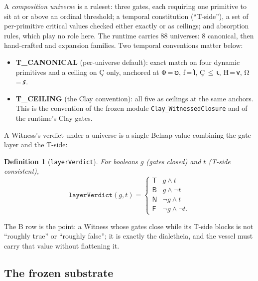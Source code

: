 \documentclass[12pt,a4paper]{article}
\newtheorem{definition}[theorem]{Definition}
\newcommand{\igp}[1]{{\igprimfont #1}}
\newcommand{\shav}[1]{{\shavfont #1}}
\newcommand{\bN}{\textsf{N}}
\newcommand{\bT}{\textsf{T}}
\newcommand{\bF}{\textsf{F}}
\newcommand{\bB}{\textsf{B}}
\begin{document}
A \emph{composition universe} is a ruleset: three gates, each requiring one
primitive to sit at or above an ordinal threshold; a temporal constitution
(``T-side''), a set of per-primitive critical values checked either exactly
or as ceilings; and absorption rules, which play no role here. The runtime
carries $88$ universes: $8$ canonical, then hand-crafted and expansion
families. Two temporal conventions matter below:

\begin{itemize}
\item \textbf{T\_CANONICAL} (per-universe default): exact match on four
dynamic primitives and a ceiling on \igp{Ç} only, anchored at
\igp{Φ}\,=\,\shav{𐑹}, \igp{ƒ}\,=\,\shav{𐑐}, \igp{Ç}\,$\le$\,\shav{𐑧},
\igp{Ħ}\,=\,\shav{𐑫}, \igp{Ω}\,=\,\shav{𐑭}.
\item \textbf{T\_CEILING} (the Clay convention): all five as ceilings at
the same anchors. This is the convention of the frozen module
\texttt{Clay\_WitnessedClosure} and of the runtime's Clay gates.
\end{itemize}

A Witness's verdict under a universe is a single Belnap value combining the
gate layer and the T-side:

\begin{definition}[\texttt{layerVerdict}]
\label{def:layerverdict}
For booleans $g$ (gates closed) and $t$ (T-side consistent),
\[
\texttt{layerVerdict}(g, t) =
\begin{cases}
\bT & g \wedge t\\
\bB & g \wedge \neg t\\
\bN & \neg g \wedge t\\
\bF & \neg g \wedge \neg t .
\end{cases}
\]
\end{definition}

The \bB{} row is the point: a Witness whose gates close while its T-side
blocks is not ``roughly true'' or ``roughly false''; it is exactly the
dialetheia, and the vessel must carry that value without flattening it.

\subsection{The frozen substrate}
\end{document}
